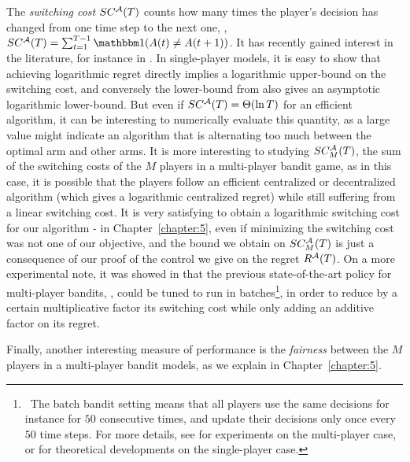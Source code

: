 The \emph{switching cost} $SC^{\mathcal{A}}(T)$ counts how many times the player's decision has changed from one time step to the next one, \ie, $SC^{\cA}(T) = \sum_{t=1}^{T-1} \indic(A(t) \neq A(t+1))$.
It has recently gained interest in the literature, for instance in \cite{Koren17}.
In single-player models,
it is easy to show that achieving logarithmic regret directly implies a logarithmic upper-bound on the switching cost, and conversely the lower-bound from \cite{LaiRobbins85} also gives an asymptotic logarithmic lower-bound.
But even if $SC^{\mathcal{A}}(T) = \Theta(\ln T)$ for an efficient algorithm, it can be interesting to numerically evaluate this quantity, as a large value might indicate an algorithm that is alternating too much between the optimal arm and other arms.
%
It is more interesting to studying $SC_M^{\mathcal{A}}(T)$, the sum of the switching costs of the $M$ players in a multi-player bandit game, as in this case, it is possible that the players follow an efficient centralized or decentralized algorithm (which gives a logarithmic centralized regret) while still suffering from a linear switching cost.
It is very satisfying to obtain a logarithmic switching cost for our algorithm \MCTopM-\klUCB{} in Chapter~\ref{chapter:5}, even if minimizing the switching cost was not one of our objective, and the bound we obtain on $SC_M^{\mathcal{A}}(T)$ is just a consequence of our proof of the control we give on the regret $R^{\mathcal{A}}(T)$.
On a more experimental note, it was showed in \cite{modiDemo2016} that the previous state-of-the-art policy for multi-player bandits, \rhoRand, could be tuned to run in batches\footnote{~The batch bandit setting means that all players use the same decisions for instance for $50$ consecutive times, and update their decisions only once every $50$ time steps. For more details, see \cite{modiDemo2016} for experiments on the multi-player case, or \cite{perchet2016,gao2019batched,kolnogorov2019multi} for theoretical developments on the single-player case.}, in order to reduce by a certain multiplicative factor its switching cost while only adding an additive factor on its regret.


Finally, another interesting measure of performance is the \emph{fairness} between the $M$ players in a multi-player bandit models, as we explain in Chapter~\ref{chapter:5}.


